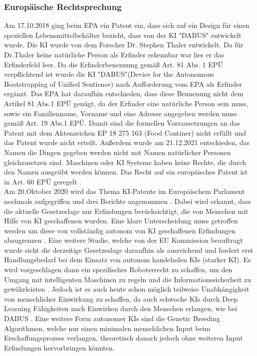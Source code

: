 \subsubsection{Europäische Rechtsprechung}
Am 17.10.2018 ging beim \gls{EPA} ein Patent ein, 
dass sich auf ein Design für einen speziellen Lebensmittelbehälter
bezieht,
dass von der KI "DABUS" entwickelt wurde. Die KI
wurde von dem Forscher Dr. Stephen Thaler entwickelt.
Da für Dr.Thaler keine natürliche Person als Erfinder
erkennbar war lies er das Erfinderfeld
leer. Da die Erfinderbenennung gemäß Art. 81 Abs. 1 EPÜ verpflichtend
ist wurde die KI 
"DABUS"(Device for the Autonomous Bootstrapping of Unified Sentience) 
nach Aufforderung vom EPA
als Erfinder ergänzt.
Das EPA hat daraufhin entschieden, 
dass diese Bennenung nicht dem Artikel 81 Abs.1 \gls{EPÜ}  genügt,
da der Erfinder eine natürliche Person sein muss, sowie ein 
Familienname, Vorname und eine Adresse angegeben werden muss
gemäß Art. 19 Abs.1 EPÜ.
Damit sind die formellen Vorrausetzungen an das Patent mit dem Aktenzeichen
EP 18 275 163 (Food Continer) nicht erfüllt und das Patent wurde nicht erteilt. 
Außerdem wurde am 21.12.2021 entschieden, das Namen die Dingen gegeben werden nicht
mit Namen natürlicher Personen gleichzusetzen sind. Maschinen oder KI
Systeme haben keine Rechte, die durch den Namen ausgeübt werden können.
Das Recht auf ein europäisches Patent
ist in Art. 60 EPÜ geregelt \cite{000820Designation}. 
\\
Am 20.Oktober 2020 wird das Thema KI-Patente im Europäischem
Parlament nochmals aufgegriffen und drei Berichte angenommen 
\cite{KIRegelnWofuerEuropaeische2020}.
Dabei wird erkannt, 
dass die aktuelle Gesetzeslage nur Erfindungen berücksichtigt,
die von Menschen mit Hilfe von KI geschaffenen wurden. 
Eine klare Unterscheidung muss getroffen werden um diese 
von vollständig autonom von KI geschaffenen Erfindungen abzugrenzen
\cite{TextsAdoptedIntellectual}.
Eine weitere Studie, welche von der EU Kommission beauftragt wurde 
sieht die derzeitige Gesetzeslage daraufhin als ausreichend 
und fordert erst Handlungsbedarf bei dem Einsatz 
von autonom handelnden KIs (starker KI).
Es wird vorgeschlagen dann ein spezifisches Roboterrecht zu schaffen, 
um den Umgang mit intelligenten Maschinen zu regeln 
und die Informationssicherheit zu gewährleisten
\cite{gutaAPPLICABILITYGDPRARTIFICIAL2022}.
Jedoch ist es auch heute schon möglich teilweise 
Unabhängigkeit von menschlicher Einwirkung
zu schaffen, da auch schwache KIs durch Deep Learning 
Fähigkeiten nach Einwirken durch den Menschen erlangen, wie bei DABUS
\cite{surdenMachineLearningLaw}\cite{dornisDornisSchopfungOhne2021}.
Eine weitere Form autonomer KIs sind die Genetic Breeding Algorithmen,
welche
nur einen minimalen menschlichen Input beim Erschaffungsprozess 
verlangen, theoretisch danach jedoch ohne weiteren Input Erfindungen 
hervorbringen könnten.



